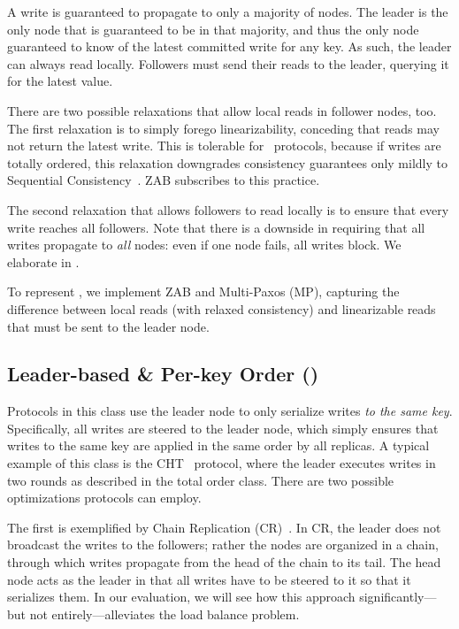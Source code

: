 A write is guaranteed to propagate to only a majority of nodes. The leader is the
only node that is guaranteed to be in that majority, and thus the only node guaranteed to know of the latest committed write for any key.
As such, the leader can always read locally.
Followers must send their reads to the leader, querying it for the latest value.

There are two possible relaxations that allow local reads in follower nodes, too. 
The first relaxation is to simply forego linearizability, conceding that reads may not return the latest write. This is tolerable 
for \LTO~protocols, because if writes are totally ordered, this relaxation downgrades consistency guarantees only mildly to Sequential Consistency~\cite{LevAri:2017}. ZAB subscribes to this practice.

The second relaxation that allows followers to read locally is to 
ensure that every write reaches all followers. 
Note that there is a downside in requiring that all writes propagate to \emph{all} nodes: even if one node fails, all writes block. We elaborate in .

To represent \LTO, we implement ZAB and Multi-Paxos (MP), capturing the difference between local reads (with relaxed consistency) and linearizable reads that must be sent to the leader node.


\subsection{Leader-based \& Per-key Order (\LPKO)}\label{sec:tax:lpko}

Protocols in this class use the leader node to only serialize writes \emph{to the same key}. Specifically, all writes are steered to the leader node, which simply ensures that writes to the same key are applied in the same order by all replicas. A typical example of this class is the CHT~\cite{Chandra:2016} protocol, where the leader executes writes in two rounds as described in the total order class. 
There are two possible optimizations protocols can employ.

The first is exemplified by Chain Replication (CR)~\cite{VanRenesse:2004}. In CR, the leader does not broadcast the writes to the followers; rather the nodes are organized in a chain, through which writes propagate from the head of the chain to its tail. The head node acts as the leader in that all writes have to be steered to it so that it serializes them. In our evaluation, we will see how this approach significantly---but not entirely---alleviates the load balance problem.

